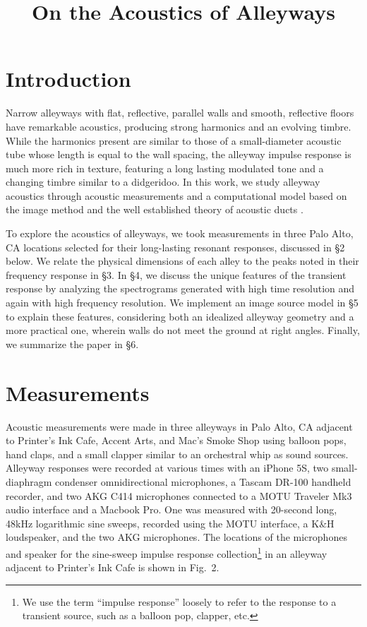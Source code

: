 \documentclass{aes137}
\affiliation[1]{Center for Computer Research in Music and Acoustics, Department of Music, Stanford University, Stanford, CA 94305 USA}
\affiliation[2]{Applied Research Laboratories and Department of Mechanical Engineering, The University of Texas at Austin, Austin, TX, USA.}
\title{}
\title{On the Acoustics of Alleyways}
\begin{document}
\maketitle %

\section{Introduction}

Narrow alleyways with flat, reflective, parallel walls and smooth,
reflective floors have remarkable acoustics, producing strong
harmonics and an evolving timbre. While the harmonics present are
similar to those of a small-diameter acoustic tube whose length is
equal to the wall spacing, the alleyway impulse response is much more
rich in texture, featuring a long lasting modulated tone and a
changing timbre similar to a didgeridoo. In this work, we study alleyway
acoustics through acoustic measurements and a computational model
based on the image method \cite{Allen,Borish} and the well established
theory of acoustic ducts \cite{Morse}.

To explore the acoustics of alleyways, we took measurements in three Palo Alto, CA locations selected for their long-lasting resonant responses, discussed in \S2 below. We relate the physical dimensions of each alley to the peaks noted in their frequency response in \S3. In \S4, we discuss the unique features of the transient response by analyzing the spectrograms generated with high time resolution and again with high frequency resolution. We implement an image source model in \S5 to explain these features, considering both an idealized alleyway geometry and a more practical one, wherein walls do not meet the ground at right angles. Finally, we summarize the paper in \S6. %


\section{Measurements}

Acoustic measurements were made in three alleyways in Palo Alto, CA adjacent to Printer's Ink Cafe, Accent Arts, and Mac's Smoke Shop
using balloon pops, hand claps, and a small clapper similar to an
orchestral whip as sound sources. Alleyway responses were recorded at various times with an iPhone 5S, two small-diaphragm condenser omnidirectional microphones, a Tascam DR-100 handheld recorder, and two AKG C414 microphones connected to a MOTU Traveler Mk3 audio interface and a Macbook Pro. One was measured with 20-second long, 48kHz logarithmic sine sweeps, recorded using the MOTU interface, a K\&H loudspeaker, and the two AKG microphones. The locations of the microphones and speaker for the sine-sweep impulse response collection\footnote{We use the term
``impulse response'' loosely to refer to the response to a transient source, such as a balloon pop, clapper, etc.} in an alleyway adjacent to
Printer's Ink Cafe is shown in Fig.~2.
\end{document}

